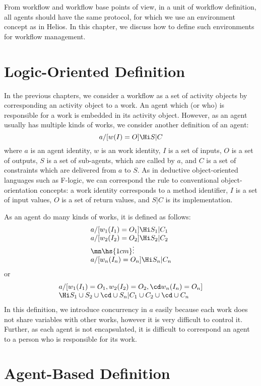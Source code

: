 From workflow and workflow base points of view, in a unit of workflow
definition, all agents should have the same protocol, for which we
use an environment concept as in Helios.
In this chapter, we discuss how to define such environments 
for workflow management.

\section{Logic-Oriented Definition}

In the previous chapters, we consider a workflow as a set of
activity objects  by corresponding an activity object to a work.
An agent which (or who) is responsible for a work is embedded in its activity
object.
However, as an agent usually has multiple kinds of works, we consider
another definition of an agent:
\[a/[w(I)=O]\Hi S|C\]
where $a$ is an agent identity, $w$ is an work identity, $I$ is a
set of inputs, $O$ is a set of outputs, $S$ is a set of sub-agents, which
are called by $a$, and $C$ is a set of constraints which are delivered
from $a$ to $S$.
As in deductive object-oriented languages such as F-logic\cite{f-logic}, 
we can correspond the rule to conventional object-orientation concepts: 
a work identity corresponds to a method identifier, $I$ is a set of
input values, $O$ is a set of return values, and $S|C$ is its 
implementation.

As an agent do many kinds of works, it is defined as follows:
\[\begin{array}{l}
a/[w_1(I_1)=O_1]\Hi S_1|C_1\\
a/[w_2(I_2)=O_2]\Hi S_2|C_2\\
\mn\hs{1cm}\vdots\\
a/[w_n(I_n)=O_n]\Hi S_n|C_n
\end{array}\]
or
\[\begin{array}{l}
a/[w_1(I_1)=O_1, w_2(I_2)=O_2,\cd w_n(I_n)=O_n]\\
\Hi S_1\cup S_2\cup\cd\cup S_n|C_1\cup C_2\cup\cd\cup C_n
\end{array}\]
In this definition, we introduce concurrency in $a$ easily because
each work does not share variables with other works, however it is very 
difficult to control it.
Further, as each agent is not encapsulated, it is difficult to correspond
an agent to a person who is responsible for its work.

\section{Agent-Based Definition}


